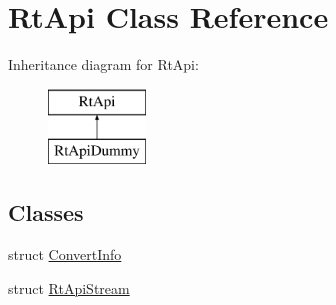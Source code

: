 \hypertarget{class_rt_api}{}\section{Rt\+Api Class Reference}
\label{class_rt_api}
Inheritance diagram for Rt\+Api\+:\begin{figure}[H]
\begin{center}
\leavevmode
\includegraphics[height=2.000000cm]{class_rt_api}
\end{center}
\end{figure}
\subsection*{Classes}
\begin{DoxyCompactItemize}
\item 
struct \hyperlink{struct_rt_api_1_1_convert_info}{Convert\+Info}
\item 
struct \hyperlink{struct_rt_api_1_1_rt_api_stream}{Rt\+Api\+Stream}
\end{DoxyCompactItemize}
